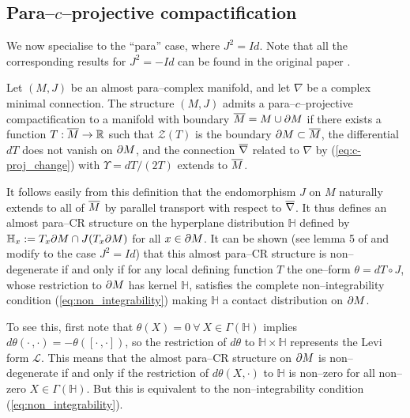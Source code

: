\subsection{Para--$c$--projective compactification}

We now specialise to the ``para'' case, where $J^2=Id$. Note that all the corresponding results for $J^2=-Id$ can be found in the original paper \cite{CG}.

\begin{defi}
\label{defi_1}  Let $(M,J)$ be an almost para--complex manifold, and let $\nabla$ be a complex minimal connection. The structure $(M,J)$ admits a para--$c$--projective compactification to a manifold with boundary $\overline{M}=M\cup\partial M$
if there exists a function $T:\overline{M}\rightarrow \mathbb{R}$ such that $\mathcal{Z}(T)$ is the boundary
$\partial M\subset \overline{M}$, the differential $dT$ does not vanish on $\partial M$, and the connection $\overline{\nabla}$ related to $\nabla$ by (\ref{eq:c-proj_change}) with $\Upsilon = dT/(2T)$ extends to $\overline{M}$.
\end{defi}



It follows easily from this definition that the endomorphism $J$ on $M$ naturally extends to all of $\overline{M}$ by parallel transport with respect to $\overline{\nabla}$. It thus defines an almost para--CR structure on the hyperplane distribution $ \mathbb{H} $ defined by $ \mathbb{H} _x:=T_x\partial M \cap J(T_x \partial M)$ for all $x\in\partial M$. It can be shown (see lemma 5 of \cite{CG} and modify to the case $J^2=Id$) that this almost para--CR structure is non--degenerate if and only if for any local defining function $T$ the one--form $\theta=dT\circ J$, whose restriction to $\partial M$ has kernel $ \mathbb{H} $, satisfies the complete non--integrability condition (\ref{eq:non_integrability}) making $ \mathbb{H} $ a contact distribution on $\partial M$.

To see this, first note that $\theta(X)=0\ \forall\ X\in\Gamma( \mathbb{H} )$ implies $d\theta(\cdot\,,\cdot)=-\theta([\cdot\,,\cdot])$, so the restriction of $d\theta$ to $ \mathbb{H} \times \mathbb{H} $ represents the Levi form $\mathcal{L}$. This means that the almost para--CR structure on $\partial M$ is non--degenerate if and only if the restriction of $d\theta(X,\cdot)$ to $ \mathbb{H} $ is non--zero for all non--zero $X\in\Gamma( \mathbb{H} )$. But this is equivalent to the non--integrability condition (\ref{eq:non_integrability}).


